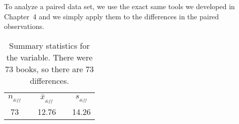 To analyze a paired data set, we use the exact same tools we developed in Chapter~4 and we simply apply them to the differences in the paired observations.
\begin{table}[hh]
\centering
\begin{tabular}{ccccc}
\hline
$n_{_{diff}}$	&\hspace{3mm}& $\bar{x}_{_{diff}}$	&\hspace{3mm}& $s_{_{diff}}$ \vspace{1mm}\\
73			&& 12.76				&& 14.26 \\
\hline
\end{tabular}
\caption{Summary statistics for the  variable. There were 73 books, so there are 73 differences.}
\label{textbooksSummaryStats}
\end{table}


